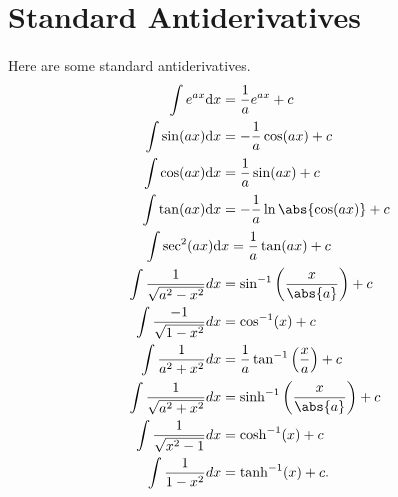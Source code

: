 \documentclass[../multivariate_calculus.tex]{subfiles}
\begin{document}


    \section{Standard Antiderivatives}
        \paragraph{}
        Here are some standard antiderivatives.
        \begin{align}
            \int e^{ax}\mathrm{d}x&=\frac{1}{a}e^{ax}+c\\
            \int\sin(ax)\mathrm{d}x&=-\frac{1}{a}\cos(ax)+c\\
            \int\cos(ax)\mathrm{d}x&=\frac{1}{a}\sin(ax)+c\\
            \int\tan(ax)\mathrm{d}x&=-\frac{1}{a}\ln\abs{\cos(ax)}+c\\
            \int\sec^2(ax)\mathrm{d}&x=\frac{1}{a}\tan(ax)+c\\
            \int\frac{1}{\sqrt{a^2-x^2}}dx&=\sin^{-1}\left(\frac{x}{\abs{a}}\right)+c \\
            \int\frac{-1}{\sqrt{1-x^2}}dx&=\cos^{-1}(x)+c \\
            \int\frac{1}{a^2+x^2}dx&=\frac{1}{a}\tan^{-1}\left(\frac{x}{a}\right)+c \\
            \int\frac{1}{\sqrt{a^2+x^2}}dx&=\sinh^{-1}\left(\frac{x}{\abs{a}}\right)+c \\
            \int\frac{1}{\sqrt{x^2-1}}dx&=\cosh^{-1}(x)+c \\
            \int\frac{1}{1-x^2}dx&=\tanh^{-1}(x)+c.
        \end{align}
\end{document}
